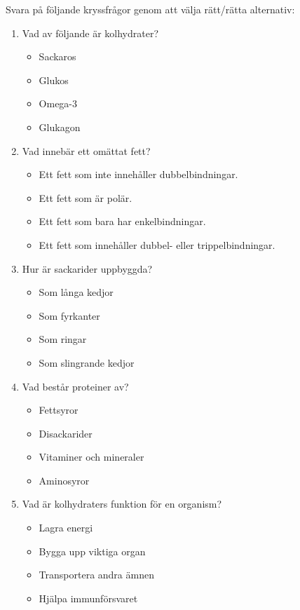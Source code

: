 \documentclass{article}
\begin{document}
Svara på följande kryssfrågor genom att välja rätt/rätta alternativ:

\begin{enumerate}[label=\arabic*.]
    \item Vad av följande är kolhydrater?
    \begin{itemize}
        \item Sackaros
        \item Glukos
        \item Omega-3
        \item Glukagon
    \end{itemize}

    \item Vad innebär ett omättat fett?
    \begin{itemize}
        \item Ett fett som inte innehåller dubbelbindningar.
        \item Ett fett som är polär.
        \item Ett fett som bara har enkelbindningar.
        \item Ett fett som innehåller dubbel- eller trippelbindningar.
    \end{itemize}

    \item Hur är sackarider uppbyggda?
    \begin{itemize}
        \item Som långa kedjor
        \item Som fyrkanter
        \item Som ringar
        \item Som slingrande kedjor
    \end{itemize}

    \item Vad består proteiner av?
    \begin{itemize}
        \item Fettsyror
        \item Disackarider
        \item Vitaminer och mineraler
        \item Aminosyror
    \end{itemize}

    \item Vad är kolhydraters funktion för en organism?
    \begin{itemize}
        \item Lagra energi
        \item Bygga upp viktiga organ
        \item Transportera andra ämnen
        \item Hjälpa immunförsvaret
    \end{itemize}


\end{enumerate}
\end{document}
